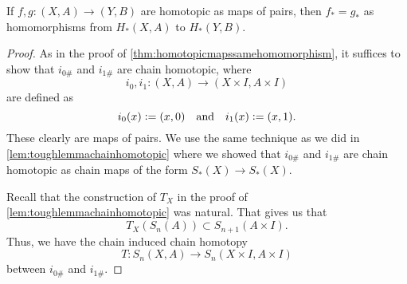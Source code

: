 \documentclass[12pt]{article}
\begin{document}
\begin{thm}
	If $f, g:(X, A) \to (Y, B)$ are homotopic as maps of pairs, then $f_* = g_*$ as homomorphisms from $H_*(X, A)$ to $H_*(Y, B).$
\end{thm}
\begin{proof} 
	As in the proof of \cref{thm:homotopicmapssamehomomorphism}, it suffices to show that $i_{0\#}$ and $i_{1\#}$ are chain homotopic, where
	\begin{equation*} 
		i_0, i_1 : (X, A) \to (X \times I, A \times I)
	\end{equation*}
	are defined as
	\begin{equation*} 
		i_{0}(x) \vcentcolon= (x, 0) \quad\text{and}\quad i_{1}(x) \vcentcolon= (x, 1).
	\end{equation*}
	These clearly are maps of pairs. We use the same technique as we did in \cref{lem:toughlemmachainhomotopic} where we showed that $i_{0\#}$ and $i_{1\#}$ are chain homotopic as chain maps of the form $S_*(X) \to S_*(X).$

	Recall that the construction of $T_X$ in the proof of \cref{lem:toughlemmachainhomotopic} was natural. That gives us that
	\begin{equation*} 
		T_X(S_{n}(A))\subset S_{n+1}(A \times I).
	\end{equation*}
	Thus, we have the chain induced chain homotopy
	\begin{equation*} 
		T:S_n(X, A) \to S_n(X\times I, A\times I)
	\end{equation*}
	between $i_{0\#}$ and $i_{1\#}.$ 
\end{proof}
\end{document}

